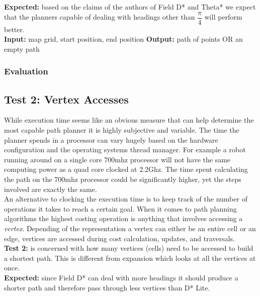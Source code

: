 \noindent
\textbf{Expected:} based on the claims of the authors of Field D* and Theta* we expect that the planners capable of dealing with headings other than $\dfrac{\pi}{4}$ will perform better.\\

\noindent
\textbf{Input:} map grid, start position, end position
\textbf{Output:} path of points OR an empty path

\subsubsection{Evaluation}

\newpage

\subsection{Test 2: Vertex Accesses}

\noindent
While execution time seems like an obvious measure that can help determine the most capable path planner it is highly subjective and variable. The time the planner spends in a processor can vary hugely based on the hardware configuration and the operating systems thread manager. For example a robot running around on a single core 700mhz processor will not have the same computing power as a quad core clocked at 2.2Ghz. The time spent calculating the path on the 700mhz processor could be significantly higher, yet the steps involved are exactly the same. \\

\noindent
An alternative to clocking the execution time is to keep track of the number of operations it takes to reach a certain goal. When it comes to path planning algorithms the highest costing operation is anything that involves accessing a \textit{vertex}. Depending of the representation a vertex can either be an entire cell or an edge, vertices are accessed during cost calculation, updates, and traversals.  \\

\noindent
\textbf{Test 2:} is concerned with how many vertices (cells) need to be accessed to build a shortest path. This is different from expansion which looks at all the vertices at once.\\

\noindent
\textbf{Expected:} since Field D* can deal with more headings it should produce a shorter path and therefore pass through less vertices than D* Lite.\\

